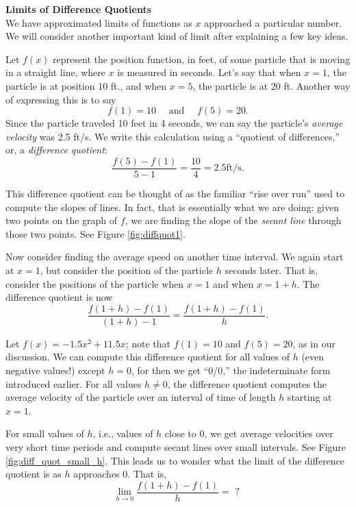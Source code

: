 \noindent\textbf{\large Limits of Difference Quotients}\\

We have approximated limits of functions as $x$ approached a particular number. We will consider another important kind of limit after explaining a few key ideas.


Let $f(x)$ represent the position function, in feet, of some particle that is moving in a straight line, where $x$ is measured in seconds. Let's say that when $x=1$, the particle is at position 10 ft., and when $x=5$, the particle is at 20 ft. Another way of expressing this is to say $$f(1)=10 \quad \text{ and } \quad f(5) = 20.$$
Since the particle traveled 10 feet in 4 seconds, we can say the particle's \textit{average velocity} was 2.5 ft/s. We write this calculation using a ``quotient of differences,'' or, a \textit{difference quotient}: $$\frac{f(5) - f(1)}{5-1} = \frac{10}4 = 2.5 \text{ft/s}.$$

This difference quotient can be thought of as the familiar ``rise over run'' used to compute the slopes of lines. In fact, that is essentially what we are doing: given two points on the graph of $f$, we are finding the slope of the \textit{secant line} through those two points. See Figure \ref{fig:diffquot1}.

Now consider finding the average speed on another time interval. We again start at $x=1$, but consider the position of the particle $h$ seconds later. That is, consider the positions of the particle when $x=1$ and when $x=1+h$. The difference quotient is now $$\frac{f(1+h)-f(1)}{(1+h)-1} = \frac{f(1+h)-f(1)}h.$$

Let $f(x) = -1.5x^2+11.5x$; note that $f(1)=10$ and $f(5) = 20$, as in our discussion. We can compute this difference quotient for all values of $h$ (even negative values!) except $h=0$, for then we get ``0/0,'' the indeterminate form introduced earlier. For all values $h\neq 0$, the difference quotient computes the average velocity of the particle over an interval of time of length $h$ starting at $x=1$. 

For small values of $h$, i.e., values of $h$ close to 0, we get average velocities over very short time periods and compute secant lines over small intervals. See Figure \ref{fig:diff_quot_small_h}. This leads us to wonder what the limit of the difference quotient is as $h$ approaches 0. That is, $$\lim_{h\to 0} \frac{f(1+h)-f(1)}{h} = \text{ ? }$$

